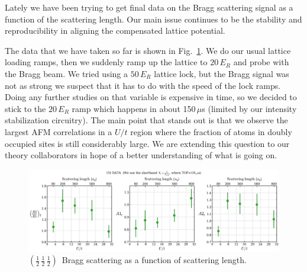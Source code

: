 \documentclass[11pt,letter]{article}
\newcommand{\hhh}{\ensuremath{\left( \frac{1}{2}\,\frac{1}{2}\,\frac{1}{2}\right)  }}
\begin{document}
Lately we have been trying to get final data on the Bragg scattering signal as
a function of the scattering length.  Our main issue continues to be the
stability and reproducibility in aligning the compensated lattice potential.  

The data that we have taken so far is shown in Fig.~\ref{fig:utdata}.  We do
our usual lattice loading ramps, then we suddenly ramp up the lattice to
$20\,E_{R}$ and probe with the Bragg beam.   We tried using a $50\,E_{R}$
lattice lock, but the Bragg signal was not as strong we suspect that it has to
do with the speed of the lock ramps.  Doing any further studies on that
variable is expensive in time, so we decided to stick to the $20\,E_{R}$ ramp
which happens in about 150\,$\mu$s (limited by our intensity stabilization
circuitry).  The main point that stands out is that we observe the largest AFM
correlations in a $U/t$ region where the fraction of atoms in doubly occupied
sites is still considerably large.  We are extending this question to our
theory collaborators in hope of a better understanding of what is going on.  
\begin{figure} \centering
\includegraphics[width=\textwidth]{../Ut_Comp/udata_average_Fancy.png}
\caption[\hhh\ Bragg scattering as a
function of scattering length. ]{\small \hhh\ Bragg scattering as a function of scattering length. } \label{fig:utdata} 
\end{figure}
\end{document}
